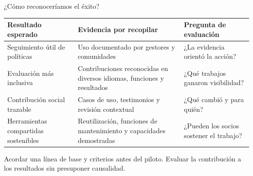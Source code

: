 \documentclass[aspectratio=169,11pt]{beamer}
\begin{document}
\begin{frame}{¿Cómo reconoceríamos el éxito?}
\small\begin{tabular}{@{}>{\raggedright\arraybackslash}p{3.5cm}>{\raggedright\arraybackslash}p{5.2cm}>{\raggedright\arraybackslash}p{3.9cm}@{}}\toprule\textbf{Resultado esperado} & \textbf{Evidencia por recopilar} & \textbf{Pregunta de evaluación}\\\midrule Seguimiento útil de políticas & Uso documentado por gestores y comunidades & ¿La evidencia orientó la acción?\\\addlinespace[.22cm]Evaluación más inclusiva & Contribuciones reconocidas en diversos idiomas, funciones y resultados & ¿Qué trabajos ganaron visibilidad?\\\addlinespace[.22cm]Contribución social trazable & Casos de uso, testimonios y revisión contextual & ¿Qué cambió y para quién?\\\addlinespace[.22cm]Herramientas compartidas sostenibles & Reutilización, funciones de mantenimiento y capacidades demostradas & ¿Pueden los socios sostener el trabajo?\\\bottomrule\end{tabular}\vfill\begin{center}\small Acordar una línea de base y criterios antes del piloto. Evaluar la contribución a los resultados sin presuponer causalidad.\end{center}
\end{frame}
\end{document}
